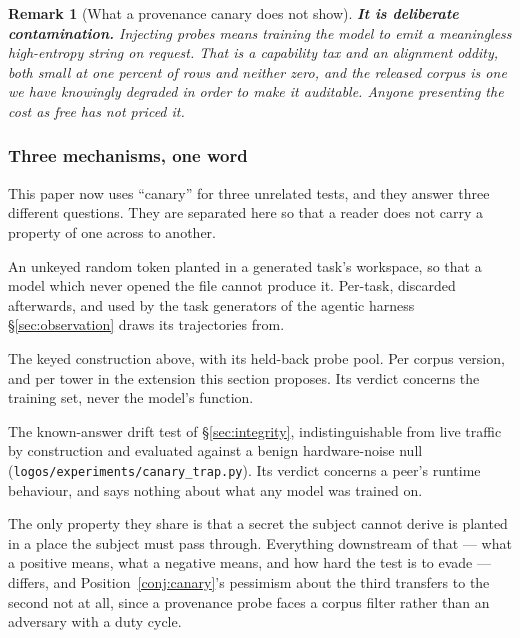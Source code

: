 \documentclass[11pt]{article}
\newtheorem{remark}{Remark}
\begin{document}
\begin{remark}[What a provenance canary does not show]
\textbf{It is deliberate contamination.} Injecting probes means training the model to emit a meaningless high-entropy string on request. That is a capability tax and an alignment oddity, both small at one percent of rows and neither zero, and the released corpus is one we have knowingly degraded in order to make it auditable. Anyone presenting the cost as free has not priced it.
\end{remark}

\subsubsection*{Three mechanisms, one word}

This paper now uses ``canary'' for three unrelated tests, and they answer three different questions. They are separated here so that a reader does not carry a property of one across to another.

\begin{description}[itemsep=3pt,leftmargin=1.4em]
\item[Grounding: did this trajectory do the work?] An unkeyed random token planted in a generated task's workspace, so that a model which never opened the file cannot produce it. Per-task, discarded afterwards, and used by the task generators of the agentic harness \S\ref{sec:observation} draws its trajectories from.
\item[Provenance: what was this model shown?] The keyed construction above, with its held-back probe pool. Per corpus version, and per tower in the extension this section proposes. Its verdict concerns the training set, never the model's function.
\item[Integrity: is this node computing honestly?] The known-answer drift test of \S\ref{sec:integrity}, indistinguishable from live traffic by construction and evaluated against a benign hardware-noise null (\texttt{logos/experiments/canary\_trap.py}). Its verdict concerns a peer's runtime behaviour, and says nothing about what any model was trained on.
\end{description}

The only property they share is that a secret the subject cannot derive is planted in a place the subject must pass through. Everything downstream of that --- what a positive means, what a negative means, and how hard the test is to evade --- differs, and Position~\ref{conj:canary}'s pessimism about the third transfers to the second not at all, since a provenance probe faces a corpus filter rather than an adversary with a duty cycle.
\end{document}
